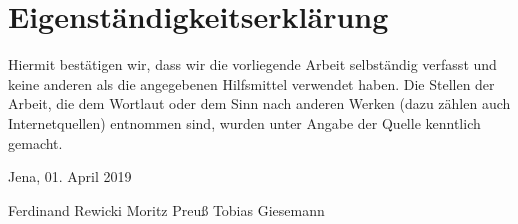 \newpage
\thispagestyle{empty}
\section*{Eigenständigkeitserklärung}
\bigskip


Hiermit bestätigen wir, dass wir die vorliegende Arbeit selbständig verfasst und keine anderen als die angegebenen Hilfsmittel verwendet haben. Die Stellen der Arbeit, die dem Wortlaut oder dem Sinn nach anderen Werken (dazu zählen auch Internetquellen) entnommen sind, wurden unter Angabe der Quelle kenntlich gemacht.

\vspace{1 cm}

\noindent
Jena, 01. April 2019

\vspace{1 cm}
Ferdinand Rewicki \hspace{3 cm} Moritz Preuß \hspace{3 cm} Tobias Giesemann
